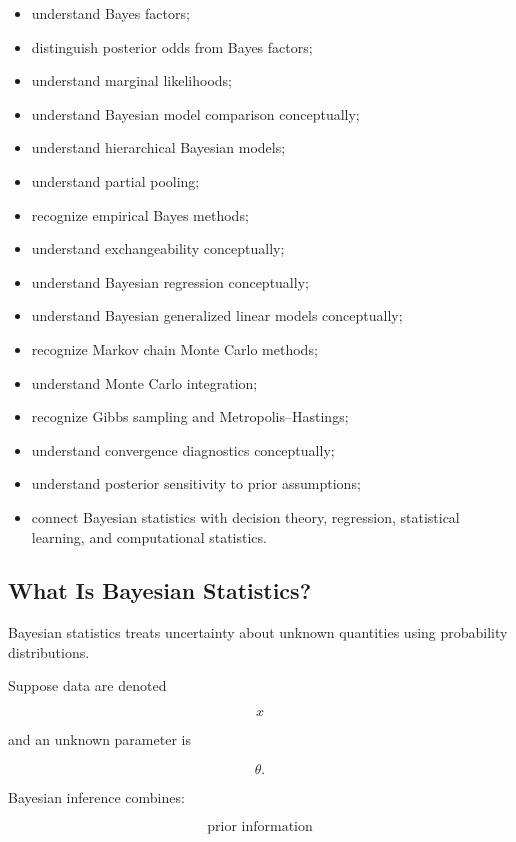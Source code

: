 {\begin{itemize}
    \item understand Bayes factors;
    \item distinguish posterior odds from Bayes factors;
    \item understand marginal likelihoods;
    \item understand Bayesian model comparison conceptually;
    \item understand hierarchical Bayesian models;
    \item understand partial pooling;
    \item recognize empirical Bayes methods;
    \item understand exchangeability conceptually;
    \item understand Bayesian regression conceptually;
    \item understand Bayesian generalized linear models conceptually;
    \item recognize Markov chain Monte Carlo methods;
    \item understand Monte Carlo integration;
    \item recognize Gibbs sampling and Metropolis--Hastings;
    \item understand convergence diagnostics conceptually;
    \item understand posterior sensitivity to prior assumptions;
    \item connect Bayesian statistics with decision theory, regression,
          statistical learning, and computational statistics.
\end{itemize}
}

\subsection{What Is Bayesian Statistics?}
\label{subsec:what-is-bayesian-statistics}

Bayesian statistics treats uncertainty about unknown quantities using
probability distributions.

Suppose data are denoted

\[
x
\]

and an unknown parameter is

\[
\theta.
\]

Bayesian inference combines:

\[
\boxed{
\text{prior information}
}
\]

